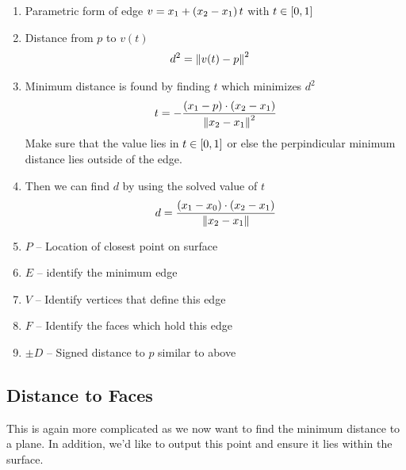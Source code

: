 \begin{enumerate}
    \item Parametric form of edge \( v = x_1 + \left( x_2 - x_1 \right) t\) with \( t \in \left[ 0, 1 \right] \)
    \item Distance from \( p \) to \( v(t) \)
        \begin{align}
            d^2 &= \left\| v(t) - p \right\|^2 
        \end{align}
    \item Minimum distance is found by finding \( t\) which minimizes \( d^2 \)
        \begin{align}
            t = - \frac{\left( x_1 - p \right) \cdot \left( x_2 - x_1 \right)}{\left\| x_2 - x_1 \right\|^2}
        \end{align}
        Make sure that the value lies in \( t \in \left[ 0, 1 \right]\) or else the perpindicular minimum distance lies outside of the edge.
    \item Then we can find \( d \) by using the solved value of \( t \)
        \begin{align}
            d = \frac{\left( x_1 - x_0 \right) \cdot \left( x_2 - x_1 \right)}{\left\| x_2 - x_1 \right\|}
        \end{align}
    \item \(P\) -- Location of closest point on surface
    \item \( E\) -- identify the minimum edge
    \item \( V\) -- Identify vertices that define this edge
    \item \( F\) -- Identify the faces which hold this edge
    \item \( \pm D\) -- Signed distance to \( p\) similar to above
\end{enumerate}

\subsection{Distance to Faces}
This is again more complicated as we now want to find the minimum distance to a plane.
In addition, we'd like to output this point and ensure it lies within the surface.

